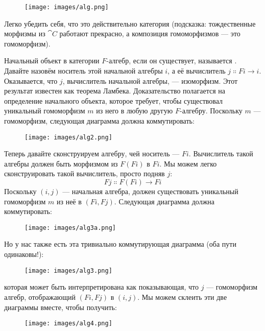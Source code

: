 \begin{figure}[H]
  \centering
  \texttt{[image: images/alg.png]}
\end{figure}

\noindent
Легко убедить себя, что это действительно категория (подсказка:
тождественные морфизмы из $\cat{C}$ работают прекрасно, а композиция
гомоморфизмов --- это гомоморфизм).

Начальный объект в категории $F$-алгебр, если он существует, называется
. Давайте назовём носитель этой начальной
алгебры $i$, а её вычислитель $j \Colon F i \to i$. Оказывается, что $j$,
вычислитель начальной алгебры, --- изоморфизм. Этот результат
известен как теорема Ламбека. Доказательство полагается на определение
начального объекта, которое требует, чтобы существовал уникальный гомоморфизм
$m$ из него в любую другую $F$-алгебру. Поскольку $m$ ---
гомоморфизм, следующая диаграмма должна коммутировать:

\begin{figure}[H]
  \centering
  \texttt{[image: images/alg2.png]}
\end{figure}

\noindent
Теперь давайте сконструируем алгебру, чей носитель --- $F i$.
Вычислитель такой алгебры должен быть морфизмом из $F (F i)$
в $F i$. Мы можем легко сконструировать такой вычислитель, просто
подняв $j$:
\[F j \Colon F (F i) \to F i\]
Поскольку $(i, j)$ --- начальная алгебра, должен существовать уникальный
гомоморфизм $m$ из неё в $(F i, F j)$. Следующая
диаграмма должна коммутировать:

\begin{figure}[H]
  \centering
  \texttt{[image: images/alg3a.png]}
\end{figure}

\noindent
Но у нас также есть эта тривиально коммутирующая диаграмма (оба пути
одинаковы!):

\begin{figure}[H]
  \centering
  \texttt{[image: images/alg3.png]}
\end{figure}

\noindent
которая может быть интерпретирована как показывающая, что $j$ --- гомоморфизм
алгебр, отображающий $(F i, F j)$ в $(i, j)$. Мы можем
склеить эти две диаграммы вместе, чтобы получить:

\begin{figure}[H]
  \centering
  \texttt{[image: images/alg4.png]}
\end{figure}

